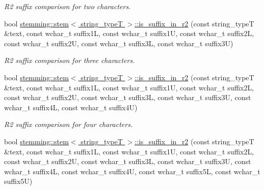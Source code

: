 \begin{DoxyCompactItemize}
\begin{DoxyCompactList}\small\item\em R2 suffix comparison for two characters. \end{DoxyCompactList}\item 
\hypertarget{group___stemming_gab5c71d01e3285eec2e79521c1b76f79d}{bool \hyperlink{group___stemming_gab5c71d01e3285eec2e79521c1b76f79d}{stemming\-::stem$<$ string\-\_\-type\-T $>$\-::is\-\_\-suffix\-\_\-in\-\_\-r2} (const string\-\_\-type\-T \&text, const wchar\-\_\-t suffix1\-L, const wchar\-\_\-t suffix1\-U, const wchar\-\_\-t suffix2\-L, const wchar\-\_\-t suffix2\-U, const wchar\-\_\-t suffix3\-L, const wchar\-\_\-t suffix3\-U)}\label{group___stemming_gab5c71d01e3285eec2e79521c1b76f79d}

\begin{DoxyCompactList}\small\item\em R2 suffix comparison for three characters. \end{DoxyCompactList}\item 
\hypertarget{group___stemming_gac12e9f11d41f69e71c7379387c4564b9}{bool \hyperlink{group___stemming_gac12e9f11d41f69e71c7379387c4564b9}{stemming\-::stem$<$ string\-\_\-type\-T $>$\-::is\-\_\-suffix\-\_\-in\-\_\-r2} (const string\-\_\-type\-T \&text, const wchar\-\_\-t suffix1\-L, const wchar\-\_\-t suffix1\-U, const wchar\-\_\-t suffix2\-L, const wchar\-\_\-t suffix2\-U, const wchar\-\_\-t suffix3\-L, const wchar\-\_\-t suffix3\-U, const wchar\-\_\-t suffix4\-L, const wchar\-\_\-t suffix4\-U)}\label{group___stemming_gac12e9f11d41f69e71c7379387c4564b9}

\begin{DoxyCompactList}\small\item\em R2 suffix comparison for four characters. \end{DoxyCompactList}\item 
\hypertarget{group___stemming_gaca8fba0d6b27d8da969508adc281cfa5}{bool \hyperlink{group___stemming_gaca8fba0d6b27d8da969508adc281cfa5}{stemming\-::stem$<$ string\-\_\-type\-T $>$\-::is\-\_\-suffix\-\_\-in\-\_\-r2} (const string\-\_\-type\-T \&text, const wchar\-\_\-t suffix1\-L, const wchar\-\_\-t suffix1\-U, const wchar\-\_\-t suffix2\-L, const wchar\-\_\-t suffix2\-U, const wchar\-\_\-t suffix3\-L, const wchar\-\_\-t suffix3\-U, const wchar\-\_\-t suffix4\-L, const wchar\-\_\-t suffix4\-U, const wchar\-\_\-t suffix5\-L, const wchar\-\_\-t suffix5\-U)}\label{group___stemming_gaca8fba0d6b27d8da969508adc281cfa5}


\end{DoxyCompactItemize}
